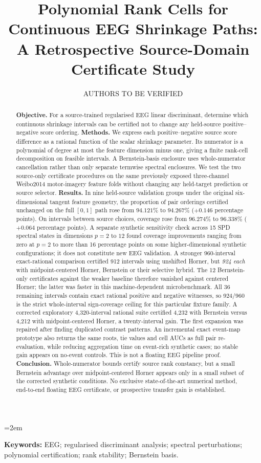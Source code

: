 \documentclass[11pt,a4paper]{article}
\title{Polynomial Rank Cells for Continuous EEG Shrinkage Paths:\\
A Retrospective Source-Domain Certificate Study}
\author{AUTHORS TO BE VERIFIED}
\date{}
\begin{document}
\emergencystretch=2em\maketitle
\begin{abstract}
\textbf{Objective.} For a source-trained
regularised EEG linear discriminant, determine
which continuous shrinkage intervals can
be certified not to change any held-source
positive--negative score ordering.
\textbf{Methods.} We express each positive--negative
source score difference as a rational function
of the scalar shrinkage parameter. Its numerator
is a polynomial of degree at most the
feature dimension minus one, giving a finite
rank-cell decomposition on feasible intervals.
A Bernstein-basis enclosure uses whole-numerator
cancellation rather than only separate
termwise spectral enclosures. We test the
two source-only certificate procedures
on the same previously exposed
three-channel Weibo2014 motor-imagery
feature folds without changing any
held-target prediction or source selector.
\textbf{Results.} In nine held-source
validation groups under the original
six-dimensional tangent feature geometry,
the proportion of pair orderings certified
unchanged on the full $[0,1]$ path rose
from $94.121\%$ to $94.267\%$
($+0.146$ percentage points). On intervals
between source choices, coverage rose
from $96.274\%$ to $96.338\%$
($+0.064$ percentage points). A separate synthetic sensitivity check across 15 SPD
spectral states in dimensions $p=2$ to $12$
found coverage improvements ranging from zero
at $p=2$ to more than 16 percentage points on
some higher-dimensional synthetic configurations;
it does not constitute new EEG validation.
A stronger 960-interval exact-rational comparison
certified 912 intervals using unshifted Horner,
but \emph{924 each} with midpoint-centered Horner,
Bernstein or their selective hybrid. The 12
Bernstein-only certificates against the weaker
baseline therefore vanished against centered
Horner; the latter was faster in this
machine-dependent microbenchmark.
All 36 remaining intervals contain exact rational
positive and negative witnesses, so 924/960 is the
strict whole-interval sign-coverage ceiling for
this particular fixture family. A corrected exploratory
4,320-interval rational suite certified 4,232 with
Bernstein versus 4,212 with midpoint-centered Horner,
a twenty-interval gain. The first expansion was
repaired after finding duplicated contrast patterns. An incremental exact event-map prototype also returns
the same roots, tie values and cell AUCs as full pair
re-evaluation, while reducing aggregation time on
event-rich synthetic cases; no stable gain appears on
no-event controls. This is not a floating EEG pipeline proof.
\textbf{Conclusion.} Whole-numerator
bounds certify source rank constancy, but
a small Bernstein advantage over
midpoint-centered Horner appears only
in a small subset of the corrected synthetic conditions.
No exclusive state-of-the-art numerical
method, end-to-end floating EEG certificate,
or prospective transfer gain is established.
\end{abstract}
\noindent\textbf{Keywords:} EEG;
regularised discriminant analysis;
spectral perturbations; polynomial
certification; rank stability;
Bernstein basis.
\end{document}
